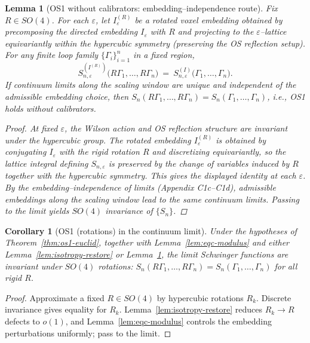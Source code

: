 \documentclass[11pt]{amsart}
\theoremstyle{plain}
\newtheorem{lemma}[theorem]{Lemma}
\newtheorem{corollary}[theorem]{Corollary}
\theoremstyle{definition}
\theoremstyle{remark}
\begin{document}
\begin{lemma}[OS1 without calibrators: embedding–independence route]\label{lem:os1-embedding}
Fix $R\in SO(4)$. For each $\varepsilon$, let $I^{(R)}_\varepsilon$ be a rotated voxel embedding obtained by precomposing the directed embedding $I_\varepsilon$ with $R$ and projecting to the $\varepsilon$–lattice equivariantly within the hypercubic symmetry (preserving the OS reflection setup). For any finite loop family $\{\Gamma_i\}_{i=1}^n$ in a fixed region,
\[
  S_{n,\varepsilon}^{(I^{(R)})}\big(R\Gamma_1,\dots,R\Gamma_n\big)
  \
  =\ S_{n,\varepsilon}^{(I)}\big(\Gamma_1,\dots,\Gamma_n\big).
\]
If continuum limits along the scaling window are unique and independent of the admissible embedding choice, then $S_n(R\Gamma_1,\dots,R\Gamma_n)=S_n(\Gamma_1,\dots,\Gamma_n)$, i.e., OS1 holds without calibrators.

\begin{proof}
At fixed $\varepsilon$, the Wilson action and OS reflection structure are invariant under the hypercubic group. The rotated embedding $I^{(R)}_\varepsilon$ is obtained by conjugating $I_\varepsilon$ with the rigid rotation $R$ and discretizing equivariantly, so the lattice integral defining $S_{n,\varepsilon}$ is preserved by the change of variables induced by $R$ together with the hypercubic symmetry. This gives the displayed identity at each $\varepsilon$. By the embedding–independence of limits (Appendix C1c–C1d), admissible embeddings along the scaling window lead to the same continuum limits. Passing to the limit yields $SO(4)$ invariance of $\{S_n\}$.
\end{proof}
\end{lemma}

\begin{corollary}[OS1 (rotations) in the continuum limit]\label{cor:os1-rotations}
Under the hypotheses of Theorem~\ref{thm:os1-euclid}, together with Lemma~\ref{lem:eqc-modulus} and either Lemma~\ref{lem:isotropy-restore} or Lemma~\ref{lem:os1-embedding}, the limit Schwinger functions are invariant under $SO(4)$ rotations: $S_n(R\Gamma_1,\dots,R\Gamma_n)=S_n(\Gamma_1,\dots,\Gamma_n)$ for all rigid $R$.
\end{corollary}

\begin{proof}
Approximate a fixed $R\in SO(4)$ by hypercubic rotations $R_k$. Discrete invariance gives equality for $R_k$. Lemma~\ref{lem:isotropy-restore} reduces $R_k\to R$ defects to $o(1)$, and Lemma~\ref{lem:eqc-modulus} controls the embedding perturbations uniformly; pass to the limit.
\end{proof}
\end{document}
